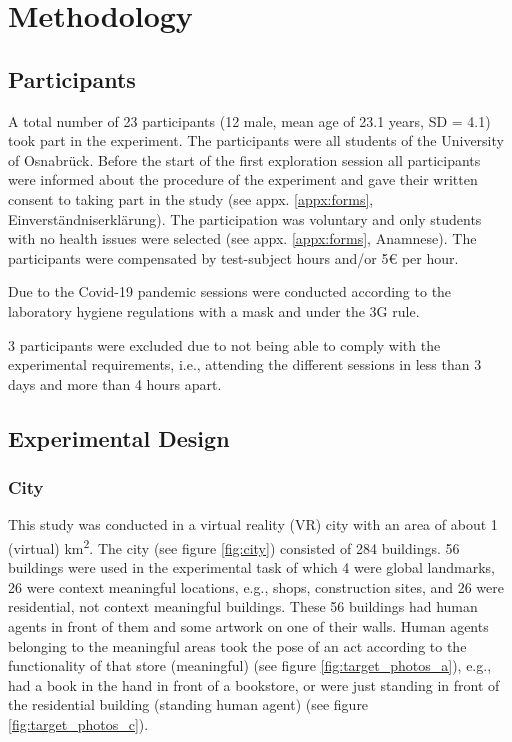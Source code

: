 \chapter{Methodology}

\section{Participants}

A total number of 23 participants (12 male, mean age of 23.1 years, SD = 4.1) took part in the experiment. The participants were all students of the University of Osnabrück. Before the start of the first exploration session all participants were informed about the procedure of the experiment and gave their written consent to taking part in the study (see appx. \ref{appx:forms}, Einverständniserklärung). The participation was voluntary and only students with no health issues were selected (see appx. \ref{appx:forms}, Anamnese). The participants were compensated by test-subject hours and/or 5€ per hour.  

Due to the Covid-19 pandemic sessions were conducted according to the laboratory hygiene regulations with a mask and under the 3G rule.

3 participants were excluded due to not being able to comply with the experimental requirements, i.e., attending the different sessions in less than 3 days and more than 4 hours apart.



\section{Experimental Design}

\subsection{City}

This study was conducted in a virtual reality (VR) city with an area of about 1 (virtual) km\textsuperscript2. The city (see figure \ref{fig:city}) consisted of 284 buildings. 56 buildings were used in the experimental task of which 4 were global landmarks, 26 were {\emphasize context meaningful} locations, e.g., shops, construction sites, and 26 were residential, {\emphasize not context meaningful} buildings. These 56 buildings had human agents in front of them and some artwork on one of their walls. Human agents belonging to the meaningful areas took the pose of an act according to the functionality of that store {\emphasize(meaningful)} (see figure \ref{fig:target_photos_a}), e.g., had a book in the hand in front of a bookstore, or were just standing in front of the residential building {\emphasize(standing human agent)} (see figure \ref{fig:target_photos_c}). 

